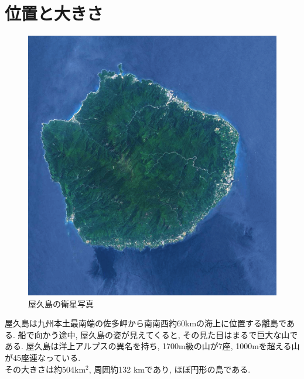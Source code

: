\documentclass[10pt,titlepage,a5paper]{ltjsbook}
\begin{document}
  \section{位置と大きさ}
  \begin{minipage}{0.38\columnwidth}
    \begin{figure}[H]
          \centering
          \includegraphics[width=\columnwidth]{yakushima.jpg}
          \caption{屋久島の衛星写真}
          \label{fig:yakushima_photo}
      \end{figure}
  \end{minipage}
  \hfill
  \begin{minipage}{0.58\columnwidth}
    屋久島は九州本土最南端の佐多岬から南南西約60kmの海上に位置する離島である. 船で向かう途中, 屋久島の姿が見えてくると, その見た目はまるで巨大な山である. 屋久島は洋上アルプスの異名を持ち,
    1700m級の山が7座, 1000mを超える山が45座連なっている. \\
    その大きさは約504$\mathrm{km^2}$, 周囲約132 kmであり, ほぼ円形の島である.
  \end{minipage}
\end{document}
